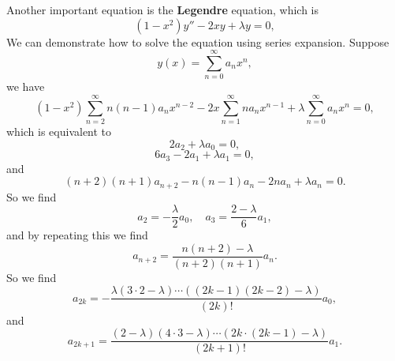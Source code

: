 \documentclass[hyperref, a4paper]{article}
\newcommand*{\concept}[1]{{\textbf{#1}}}
\begin{document}
Another important equation is the \concept{Legendre} equation, 
which is 
\begin{equation}
    (1 - x^2) y'' - 2 x y + \lambda y = 0,
\end{equation}
We can demonstrate how to solve the equation using series expansion. 
Suppose 
\begin{equation}
    y(x) = \sum_{n=0}^{\infty} a_n x^n,
\end{equation}
we have 
\[
    (1 - x^2) \sum_{n=2}^{\infty} n(n-1) a_n x^{n-2}
    - 2x \sum_{n=1}^{\infty} n a_n x^{n-1}
    + \lambda \sum_{n=0}^{\infty} a_n x^n = 0,
\]
which is equivalent to 
\[
    2 a_2 + \lambda a_0 = 0, 
\]
\[
    6 a_3 - 2 a_1 + \lambda a_1 = 0,
\]
and 
\[
    (n+2)(n+1) a_{n+2} - n(n-1) a_n - 2 n a_n + \lambda a_n = 0.
\]
So we find 
\[
    a_2 = - \frac{\lambda}{2} a_0, \quad   
    a_3 = \frac{2 - \lambda}{6} a_1, 
\]
and by repeating this we find 
\begin{equation}
    a_{n+2} = \frac{
        n(n+2) - \lambda
    }{
        (n + 2) (n + 1)
    } a_n.
\end{equation}
So we find 
\begin{equation}
    a_{2k} = - \frac{
        \lambda (3 \cdot 2 - \lambda) \cdots ((2k-1)(2k-2) - \lambda)
    }{
        (2k)!
    } a_0,
\end{equation}
and 
\begin{equation}
    a_{2k+1} = \frac{
        (2 - \lambda) (4 \cdot 3 - \lambda) \cdots (2k \cdot (2k - 1) - \lambda)
    }{
        (2 k + 1)!
    } a_1.
\end{equation}
\end{document}
